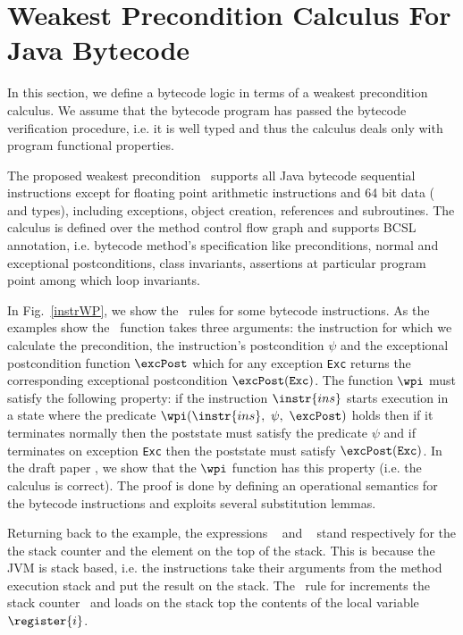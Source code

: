 
\section{Weakest Precondition Calculus For Java Bytecode}\label{wpbc}
In this section, we define a bytecode logic in terms of a weakest precondition calculus.
We assume that the bytecode program has passed the bytecode verification procedure, i.e. it is well typed and
 thus the calculus deals only with program functional properties. 

The proposed weakest precondition \wpi \ supports all Java bytecode sequential instructions except for floating point
 arithmetic instructions and 64 bit data ( and  types), including exceptions, object creation,
 references and subroutines. The calculus is defined over the method control flow graph and supports BCSL annotation,
 i.e. bytecode method's specification like preconditions, normal and exceptional postconditions, class invariants,
 assertions at particular program point among which loop invariants.

 In Fig.~\ref{instrWP}, we show the \wpi \ rules for some bytecode instructions. 
As the examples show the \wpi \ function takes three arguments:
the instruction for which we calculate the precondition, 
the instruction's postcondition $\psi$ and the exceptional postcondition function $\excPost$ which for any exception \texttt{Exc} returns the
corresponding exceptional postcondition $\excPost(\texttt{Exc})$. 
The function $\wpi$ must satisfy the following property: if the instruction $\instr{ins}$ starts execution in a state where the predicate
$\wpi(\instr{ins}, \ \psi, \ \excPost)$ holds then if it terminates normally then the poststate must satisfy the predicate $\psi$  
and if terminates on exception \texttt{Exc} then  the poststate must satisfy $\excPost(\texttt{Exc})$.
 In the draft paper \cite{JBL05MP}, we show that the $\wpi$ function has this property (i.e. the calculus is correct). The proof is done by defining an operational semantics for the bytecode instructions and exploits several substitution lemmas.

Returning back to the example, the expressions \counter~ and  \stack{\counter}~ stand respectively for the the stack counter and the element on the top of the stack.
 This is because the JVM is stack based, i.e. the instructions take their arguments from the method execution stack and 
 put the result on the stack.
 The \wpi \ rule for   increments the stack counter \counter \ and loads on the stack top the contents
 of the local variable $\register{i}$. 

